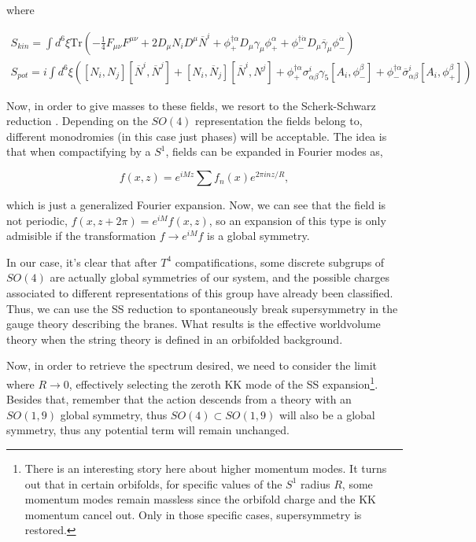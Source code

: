where

\begin{equation}
    \begin{aligned}
        S_{kin} = \int d^6\xi \text{Tr} \left(-\frac14 F_{\mu\nu}F^{\mu\nu}+2D_\mu N_iD^\mu \overline{N}^i+ \phi_{+}^{\dagger\alpha}D_{\mu}\gamma_{\mu}\phi_{+}^{\alpha}+\phi_{-}^{{\dagger\dot{\alpha}}}D_{\mu}\overline{\gamma}_{\mu}\phi_{-}^{{\dot{\alpha}}}\right) \\
        S_{pot} = i\int d^{6}\xi \left([N_i,N_j][\overline{N}^i,\overline{N}^j] +  [N_i, \overline{N}_j][\overline{N}^i, N^j]+\phi_+^{\dagger\alpha}\sigma_{\alpha\beta}^i\gamma_5[A_i,\phi_-^\beta]+\phi_-^{\dagger\alpha}\overline{\sigma}_{\alpha\beta}^i[A_i,\phi_+^\beta]\right)
    \end{aligned}
\end{equation}

Now, in order to give masses to these fields, we resort to the Scherk-Schwarz reduction \cite{SCHERK197960}. Depending on the $SO(4)$ representation the fields belong to, different monodromies (in this case just phases) will be acceptable. The idea is that when compactifying by a $S^1$, fields can be expanded in Fourier modes as,

\begin{equation}
    f(x, z) = e^{iMz} \sum f_n(x) e^{2\pi i n z / R},
\end{equation}

which is just a generalized Fourier expansion. Now, we can see that the field is not periodic, $f(x,z+2\pi) = e^{iM}f(x,z)$, so an expansion of this type is only admisible if the transformation $f \rightarrow e^{iM} f$ is a global symmetry.

In our case, it's clear that after $T^4$ compatifications, some discrete subgrups of $SO(4)$ are actually global symmetries of our system, and the possible charges associated to different representations of this group have already been classified. Thus, we can use the SS reduction to spontaneously break supersymmetry in the gauge theory describing the branes. What results is the effective worldvolume theory when the string theory is defined in an orbifolded background.

Now, in order to retrieve the spectrum desired, we need to consider the limit where $R \rightarrow 0$, effectively selecting the zeroth KK mode of the SS expansion\footnote{There is an interesting story here about higher momentum modes. It turns out that in certain orbifolds, for specific values of the $S^1$ radius $R$, some momentum modes remain massless since the orbifold charge and the KK momentum cancel out. Only in those specific cases, supersymmetry is restored.}. Besides that, remember that the action descends from a theory with an $SO(1,9)$ global symmetry, thus $SO(4)\subset SO(1,9)$ will also be a global symmetry, thus any potential term will remain unchanged.

